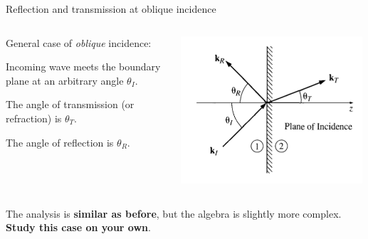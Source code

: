 %
%
%

\begin{frame}{Reflection and transmission at oblique incidence}

\begin{columns}
  \begin{column}{0.66\textwidth}
   {\small
     General case of {\em oblique} incidence:
     \begin{itemize}
     {\small
        \item Incoming wave meets the boundary plane at an arbitrary angle $\theta_I$.
        \item The angle of transmission (or refraction) is $\theta_T$.
        \item The angle of reflection is $\theta_R$.
     }
     \end{itemize}
   }
  \end{column}
  \begin{column}{0.34\textwidth}
    \begin{center}
      \includegraphics[width=0.99\textwidth]{./images/schematics/wave_reflection_transmission_oblique_incidence.png}\\
    \end{center}
  \end{column}
\end{columns}

The analysis is {\bf similar as before}, but the algebra is slightly more complex.\\
\vspace{0.2cm}
{\bf Study this case on your own}.\\

\end{frame}

